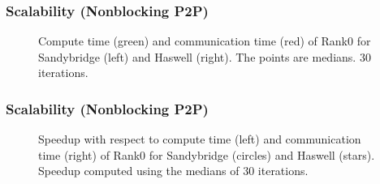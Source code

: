 \documentclass[10pt, compress]{beamer}
\begin{document}
\begin{frame}
  \frametitle{Scalability (Nonblocking P2P)}
  \begin{figure}
  \centering
  \caption{Compute time (green) and communication time (red) of Rank0 for Sandybridge (left) and Haswell (right). The points are medians. 30 iterations.}
  \label{fig:times_nonblocking}
  \end{figure}
\end{frame}

\begin{frame}
  \frametitle{Scalability (Nonblocking P2P)}
  \begin{figure}
  \centering
  \caption{Speedup with respect to compute time (left) and communication time (right) of Rank0 for Sandybridge (circles) and Haswell (stars). Speedup computed using the medians of 30 iterations.}
  \label{fig:speedup_nonblocking}
  \end{figure}
\end{frame}
\end{document}
